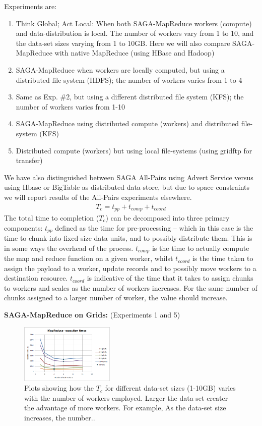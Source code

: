 \documentclass[conference,final]{IEEEtran}
\newcommand{\sagamapreduce }{SAGA-MapReduce }
\newcommand{\tc }{ $T_c$ }
\begin{document}
Experiments are:
\begin{enumerate}
\item Think Global; Act Local: When both \sagamapreduce workers
  (compute) and data-distribution is local. The number of workers vary
  from 1 to 10, and the data-set sizes varying from 1 to 10GB. Here we
  will also compare \sagamapreduce with native MapReduce (using HBase
  and Hadoop)
\item \sagamapreduce when workers are locally computed, but using a distributed file system (HDFS); the number of workers varies from 1 to 4
\item Same as Exp. \#2, but using a different distributed file system
  (KFS); the number of workers varies from 1-10
\item \sagamapreduce using distributed compute (workers) and distributed file-system (KFS)
\item Distributed compute (workers) but using local file-systems (using gridftp for transfer)
\end{enumerate}

We have also distinguished between SAGA All-Pairs using Advert Service
versus using Hbase or BigTable as distributed data-store, but due to
space constraints we will report results of the All-Pairs experiments
elsewhere.
\begin{eqnarray}
T_c = t_{pp} + t_{comp} + t_{coord}
\end{eqnarray}
The total time to completion ($T_c$) can be decomposed into three
primary components: $t_{pp}$ defined as the time for pre-processing --
which in this case is the time to chunk into fixed size data units,
and to possibly distribute them. This is in some ways the overhead of
the process.  $t_{comp}$ is the time to actually compute the map and
reduce function on a given worker, whilst $t_{coord}$ is the time
taken to assign the payload to a worker, update records and to
possibly move workers to a destination resource. $t_{coord}$ is
indicative of the time that it takes to assign chunks to workers and
scales as the number of workers increases. For the same number of
chunks assigned to a larger number of worker, the value should
increase.


{\bf SAGA-MapReduce on Grids:} (Experiments 1 and
5) %

\begin{figure}[t]
  \includegraphics[width=0.4\textwidth]{MapReduce_local_executiontime.png}
\caption{Plots showing how the \tc for different data-set sizes
  (1-10GB) varies with the number of workers employed.
  Larger the data-set creater the advantage of more workers. For
  example, As the data-set size increases, the number..}
\label{grids1}
\end{figure}
\end{document}
